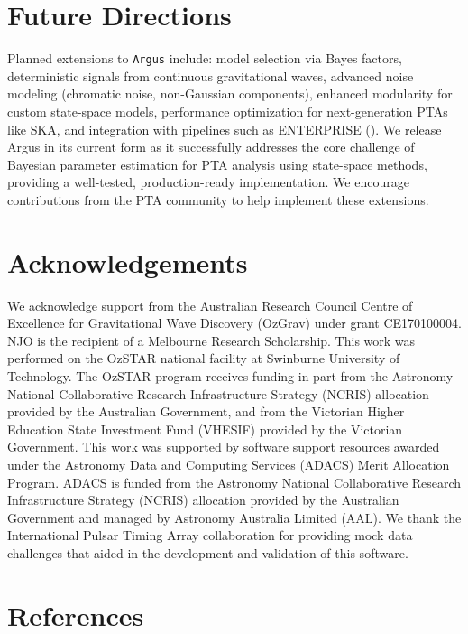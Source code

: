 \documentclass[
]{article}
\begin{document}
\section{Future Directions}\label{future-directions}

Planned extensions to \texttt{Argus} include: model selection via Bayes
factors, deterministic signals from continuous gravitational waves,
advanced noise modeling (chromatic noise, non-Gaussian components),
enhanced modularity for custom state-space models, performance
optimization for next-generation PTAs like SKA, and integration with
pipelines such as ENTERPRISE (). We release Argus in its current form as it successfully
addresses the core challenge of Bayesian parameter estimation for PTA
analysis using state-space methods, providing a well-tested,
production-ready implementation. We encourage contributions from the PTA
community to help implement these extensions.

\section{Acknowledgements}\label{acknowledgements}

We acknowledge support from the Australian Research Council Centre of
Excellence for Gravitational Wave Discovery (OzGrav) under grant
CE170100004. NJO is the recipient of a Melbourne Research Scholarship.
This work was performed on the OzSTAR national facility at Swinburne
University of Technology. The OzSTAR program receives funding in part
from the Astronomy National Collaborative Research Infrastructure
Strategy (NCRIS) allocation provided by the Australian Government, and
from the Victorian Higher Education State Investment Fund (VHESIF)
provided by the Victorian Government. This work was supported by
software support resources awarded under the Astronomy Data and
Computing Services (ADACS) Merit Allocation Program. ADACS is funded
from the Astronomy National Collaborative Research Infrastructure
Strategy (NCRIS) allocation provided by the Australian Government and
managed by Astronomy Australia Limited (AAL). We thank the International
Pulsar Timing Array collaboration for providing mock data challenges
that aided in the development and validation of this software.

\section*{References}\label{references}
\end{document}

